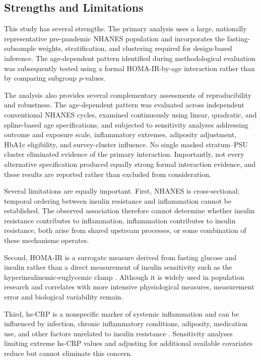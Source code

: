 \documentclass[11pt]{article}
\begin{document}
\subsection{Strengths and Limitations}

This study has several strengths. The primary analysis uses a large,
nationally representative pre-pandemic NHANES population and incorporates
the fasting-subsample weights, stratification, and clustering required for
design-based inference. The age-dependent pattern identified during
methodological evaluation was subsequently tested using a formal
HOMA-IR-by-age interaction rather than by comparing subgroup $p$-values.

The analysis also provides several complementary assessments of
reproducibility and robustness. The age-dependent pattern was evaluated
across independent conventional NHANES cycles, examined continuously using
linear, quadratic, and spline-based age specifications, and subjected to
sensitivity analyses addressing outcome and exposure scale, inflammatory
extremes, adiposity adjustment, HbA1c eligibility, and survey-cluster
influence. No single masked stratum--PSU cluster eliminated evidence of the
primary interaction. Importantly, not every alternative specification
produced equally strong formal interaction evidence, and these results are
reported rather than excluded from consideration.

Several limitations are equally important. First, NHANES is cross-sectional;
temporal ordering between insulin resistance and inflammation cannot be
established. The observed association therefore cannot determine whether
insulin resistance contributes to inflammation, inflammation contributes
to insulin resistance, both arise from shared upstream processes, or some
combination of these mechanisms operates.

Second, HOMA-IR is a surrogate measure derived from fasting glucose and
insulin rather than a direct measurement of insulin sensitivity such as the
hyperinsulinemic-euglycemic clamp \citep{DeFronzo1979,Wallace2004}. Although
it is widely used in population research and correlates with more intensive
physiological measures, measurement error and biological variability
remain.

Third, hs-CRP is a nonspecific marker of systemic inflammation and can be
influenced by infection, chronic inflammatory conditions, adiposity,
medication use, and other factors unrelated to insulin resistance \citep{Pepys2003}.
Sensitivity analyses limiting extreme hs-CRP values and adjusting for
additional available covariates reduce but cannot eliminate this concern.
\end{document}
